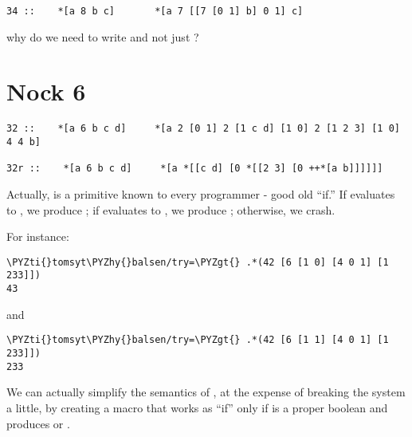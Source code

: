 \begin{framed_shaded}
\begin{Verbatim}[fontsize=\relsize{-2.5},fontseries=b,commandchars=\\\{\}]
    34 ::    *[a 8 b c]       *[a 7 [[7 [0 1] b] 0 1] c]
\end{Verbatim}
\end{framed_shaded}
why do we need to write \kode{[7 [0 1] b]} and not just ?

\section{Nock 6}

\begin{framed_shaded}
\begin{Verbatim}[fontsize=\relsize{-2.5},fontseries=b,commandchars=\\\{\}]
32 ::    *[a 6 b c d]     *[a 2 [0 1] 2 [1 c d] [1 0] 2 [1 2 3] [1 0] 4 4 b]

32r ::    *[a 6 b c d]     *[a *[[c d] [0 *[[2 3] [0 ++*[a b]]]]]]
\end{Verbatim}
\end{framed_shaded}

Actually,  is a primitive known to every programmer - good old
``if.''  If  evaluates to , we produce ; if  evaluates
to , we produce ; otherwise, we crash.

For instance:

\begin{framed_shaded}
\begin{Verbatim}[fontsize=\relsize{-2.5},fontseries=b,commandchars=\\\{\}]
\PYZti{}tomsyt\PYZhy{}balsen/try=\PYZgt{} .*(42 [6 [1 0] [4 0 1] [1 233]])
43
\end{Verbatim}
\end{framed_shaded}
and

\begin{framed_shaded}
\begin{Verbatim}[fontsize=\relsize{-2.5},fontseries=b,commandchars=\\\{\}]
\PYZti{}tomsyt\PYZhy{}balsen/try=\PYZgt{} .*(42 [6 [1 1] [4 0 1] [1 233]])
233
\end{Verbatim}
\end{framed_shaded}

We can actually simplify the semantics of , at the expense of
breaking the system a little, by creating a macro that works as
``if'' only if  is a proper boolean and produces  or .

